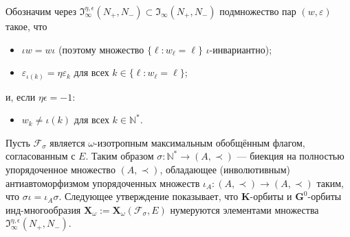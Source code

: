 \documentclass{amsart}
\theoremstyle{definition}
\newcommand{\NN}{\mathbb{N}^*}
\begin{document}
Обозначим через $\mathfrak{I}_\infty^{\eta,\epsilon}(N_+,N_-)\subset
\mathfrak{I}_\infty(N_+,N_-)$ подмножество пар
$(w,\varepsilon)$ такое, что
\begin{itemize}
\item[\rm (i)] $\iota w=w\iota$ (поэтому множество $\{\ell:w_\ell=\ell\}$  $\iota$-инвариантно);
\item[\rm (ii)] $\varepsilon_{\iota(k)}=\eta\varepsilon_k$ для всех $k\in\{\ell:w_\ell=\ell\}$;
\end{itemize}
и, если $\eta\epsilon=-1$:
\begin{itemize}
\item[\rm (iii)] 

 $w_k\not=\iota(k)$ для всех $k\in\mathbb{N}^*$.
\end{itemize}

Пусть $\mathcal{F}_\sigma$ является $\omega$-изотропным максимальным  обобщённым флагом, согласованным с $E$.
Таким образом $\sigma:\NN\to(A,\prec)$ --- биекция на
полностью упорядоченное множество $(A,\prec)$, обладающее (инволютивным) антиавтоморфизмом упорядоченных множеств
$\iota_A:(A,\prec)\to (A,\prec)$ таким, что $\sigma\iota=\iota_A\sigma$.
Следующее утверждение показывает, что $\mathbf{K}$-орбиты и $\mathbf{G}^0$-орбиты
инд-многообразия $\mathbf{X}_\omega:=\mathbf{X}_\omega(\mathcal{F}_\sigma,E)$
нумеруются элементами множества $\mathfrak{I}_\infty^{\eta,\epsilon}(N_+,N_-)$.
\end{document}
